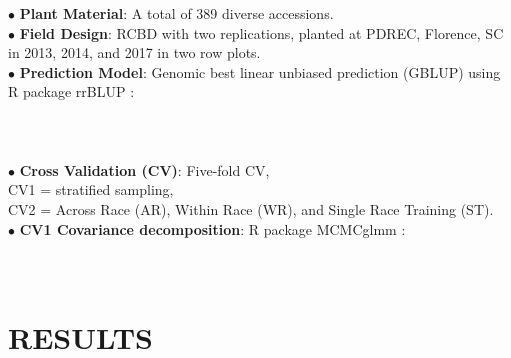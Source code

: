 \documentclass[a0,portrait]{a0poster}
\begin{document}
\begin{minipage}[c]{\linewidth}
\begin{framed}
\begin{multicols}{2}
{{\hspace{0.1cm}$\bullet$ \textbf{Plant Material}: A total of 389 diverse accessions.\\
\hspace{0.1cm}$\bullet$ \textbf{Field Design}: RCBD with two replications, planted at PDREC, Florence, SC in 2013, 2014, and 2017 in two row plots.\\
\hspace{0.1cm}$\bullet$ \textbf{Prediction Model}: Genomic best linear unbiased prediction (GBLUP) using R package rrBLUP \citep{endelman2011ridge}:\\\\
\\\\
\hspace{0.1cm}$\bullet$ \textbf{Cross Validation (CV)}: Five-fold CV,\\
CV1 = stratified sampling,\\
CV2 = Across Race (AR), Within Race (WR), and Single Race Training (ST).\\ 
\hspace{0.1cm}$\bullet$ \textbf{CV1 Covariance decomposition}: R package MCMCglmm \citep{hadfield2010mcmc}:\\\\
 \\%
}}

\vspace{-0.25cm}
\section*{RESULTS}


\end{multicols}
\end{framed}
\end{minipage}
\end{document}
